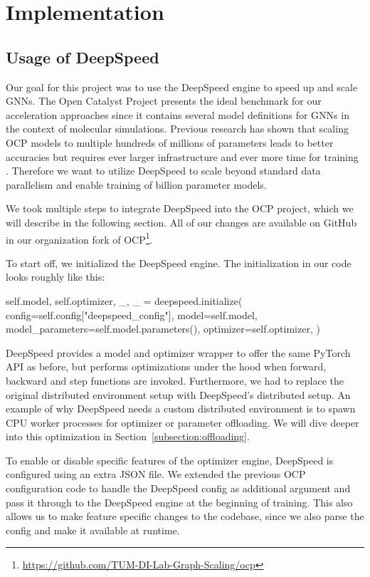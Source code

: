 \section{Implementation}
\label{section:implementation}

\subsection{Usage of DeepSpeed}

Our goal for this project was to use the DeepSpeed engine to speed up and scale 
GNNs. The Open Catalyst Project presents the ideal 
benchmark for our acceleration approaches since it contains several model definitions 
for GNNs in the context of molecular simulations. Previous research has shown 
that scaling OCP models to multiple hundreds of millions of parameters 
leads to better accuracies but requires ever larger infrastructure
and ever more time for training \cite{https://doi.org/10.48550/arxiv.2203.09697}. 
Therefore we want to utilize 
DeepSpeed to scale beyond standard data parallelism and enable training of billion 
parameter models.

We took multiple steps to integrate DeepSpeed into the OCP project, which we will 
describe in the following section. All of our changes are available on GitHub in our 
organization fork of OCP\footnote{\url{https://github.com/TUM-DI-Lab-Graph-Scaling/ocp}}.

To start off, we initialized the DeepSpeed engine. 
The initialization in our code looks roughly like this:

\begin{python}
self.model, self.optimizer, _, _ = deepspeed.initialize(
    config=self.config["deepspeed_config"],
    model=self.model,
    model_parameters=self.model.parameters(),
    optimizer=self.optimizer,
)
\end{python}

DeepSpeed provides a model and optimizer wrapper to offer the same PyTorch API as 
before, but performs optimizations under the hood when forward, backward and step 
functions are invoked. Furthermore, we had to replace the original distributed 
environment setup with DeepSpeed's distributed setup. An example of why DeepSpeed 
needs a custom distributed environment is to spawn CPU worker processes for optimizer 
or parameter offloading. We 
will dive deeper into this optimization in Section~\ref{subsection:offloading}.

To enable or disable specific features of the optimizer engine, DeepSpeed is 
configured using an extra JSON file. We extended the previous OCP configuration 
code to handle the DeepSpeed config as additional argument and pass it through 
to the DeepSpeed engine at the beginning of training. This also allows us to 
make feature specific changes to the codebase, since we also parse the config and 
make it available at runtime.

